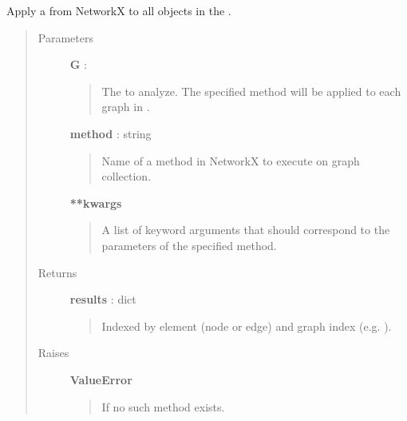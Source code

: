 \documentclass[letterpaper,10pt,english]{sphinxmanual}
\begin{document}

\begin{fulllineitems}
\label{tethne.analyze.collection:tethne.analyze.collection.algorithm}
Apply a  from NetworkX to all  objects in the
{\hyperref[tethne.classes.graphcollection:tethne.classes.graphcollection.GraphCollection]{}} .
\begin{quote}\begin{description}
\item[{Parameters}] \leavevmode
\textbf{G} : {\hyperref[tethne.classes.graphcollection:tethne.classes.graphcollection.GraphCollection]{}}
\begin{quote}

The {\hyperref[tethne.classes.graphcollection:tethne.classes.graphcollection.GraphCollection]{}} to analyze. The specified method will be
applied to each graph in .
\end{quote}

\textbf{method} : string
\begin{quote}

Name of a method in NetworkX to execute on graph collection.
\end{quote}

\textbf{**kwargs}
\begin{quote}

A list of keyword arguments that should correspond to the parameters
of the specified method.
\end{quote}

\item[{Returns}] \leavevmode
\textbf{results} : dict
\begin{quote}

Indexed by element (node or edge) and graph index (e.g. ).
\end{quote}

\item[{Raises}] \leavevmode
\textbf{ValueError}
\begin{quote}

If no such method exists.
\end{quote}

\end{description}\end{quote}

\end{fulllineitems}
\end{document}
